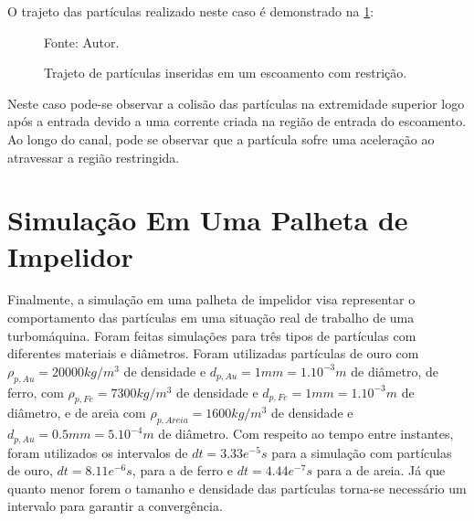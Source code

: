 O trajeto das partículas realizado neste caso é demonstrado na \ref{nozzle_trajectory}:
\begin{figure}[H]
    \centering
     {\raggedleft \scriptsize Fonte: Autor.}
    \caption{Trajeto de partículas inseridas em um escoamento com restrição.}
    \label{nozzle_trajectory}
\end{figure}

Neste caso pode-se observar a colisão das partículas na extremidade superior logo após a entrada devido a uma corrente criada na região de entrada do escoamento.
Ao longo do canal, pode se observar que a partícula sofre uma aceleração ao atravessar a região restringida.

\section{\textbf{Simulação Em Uma Palheta de Impelidor}}
\label{sec_rotor}
Finalmente, a simulação em uma palheta de impelidor visa representar o comportamento das partículas em uma situação real de trabalho de uma turbomáquina.
Foram feitas simulações para três tipos de partículas com diferentes materiais e diâmetros.
Foram utilizadas partículas de ouro com $\rho_{p,Au}=20000kg/m^3$ de densidade e $d_{p,Au}=1mm=1.10^{-3}m$ de diâmetro, de ferro, com $\rho_{p,Fe}=7300kg/m^3$ de densidade e $d_{p,Fe}=1mm=1.10^{-3}m$ de diâmetro, e de areia com $\rho_{p,Areia}=1600kg/m^3$ de densidade e $d_{p,Au}=0.5mm=5.10^{-4}m$ de diâmetro.
Com respeito ao tempo entre instantes, foram utilizados os intervalos de $dt=3.33e^{-5}s$ para a simulação com partículas de ouro, $dt=8.11e^{-6}s$, para a de ferro e $dt=4.44e^{-7}s$ para a de areia.
Já que quanto menor forem o tamanho e densidade das partículas torna-se necessário um intervalo para garantir a convergência.

